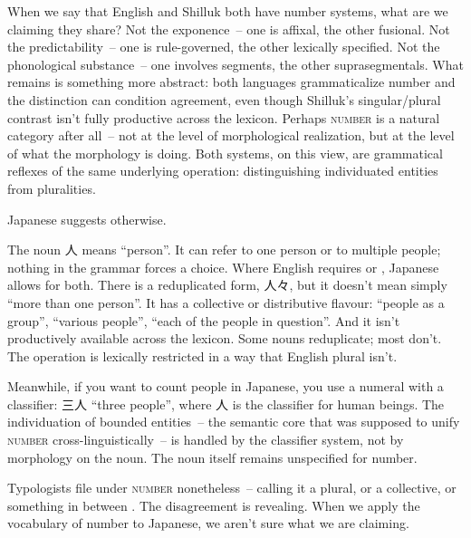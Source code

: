 When we say that English and Shilluk both have number systems, what are we claiming they share? Not the exponence~-- one is affixal, the other fusional. Not the predictability~-- one is rule-governed, the other lexically specified. Not the phonological substance~-- one involves segments, the other suprasegmentals. What remains is something more abstract: both languages grammaticalize number and the distinction can condition agreement, even though Shilluk's singular/plural contrast isn't fully productive across the lexicon. Perhaps \textsc{number} is a natural category after all~-- not at the level of morphological realization, but at the level of what the morphology is doing. Both systems, on this view, are grammatical reflexes of the same underlying operation: distinguishing individuated entities from pluralities.

Japanese suggests otherwise.

The noun  人 means \enquote{person}. It can refer to one person or to multiple people; nothing in the grammar forces a choice. Where English requires  or , Japanese allows  for both. There is a reduplicated form,  人々, but it doesn't mean simply \enquote{more than one person}. It has a collective or distributive flavour: \enquote{people as a group}, \enquote{various people}, \enquote{each of the people in question}. And it isn't productively available across the lexicon. Some nouns reduplicate; most don't. The operation is lexically restricted in a way that English plural  isn't.

Meanwhile, if you want to count people in Japanese, you use a numeral with a classifier:  三人 \enquote{three people}, where  人 is the classifier for human beings. The individuation of bounded entities~-- the semantic core that was supposed to unify \textsc{number} cross-linguistically~-- is handled by the classifier system, not by morphology on the noun. The noun itself remains unspecified for number.

Typologists file  under \textsc{number} nonetheless~-- calling it a plural, or a collective, or something in between \citep[cf.][]{baloglu2022,forza2016}. The disagreement is revealing. When we apply the vocabulary of number to Japanese, we aren't sure what we are claiming.

